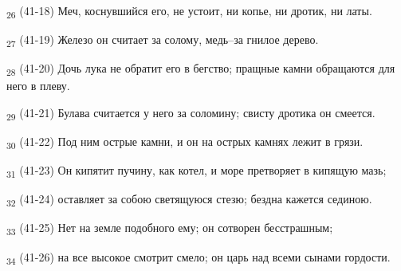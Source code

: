 \begin{tcolorbox}
\textsubscript{26} (41-18) Меч, коснувшийся его, не устоит, ни копье, ни дротик, ни латы.
\end{tcolorbox}
\begin{tcolorbox}
\textsubscript{27} (41-19) Железо он считает за солому, медь--за гнилое дерево.
\end{tcolorbox}
\begin{tcolorbox}
\textsubscript{28} (41-20) Дочь лука не обратит его в бегство; пращные камни обращаются для него в плеву.
\end{tcolorbox}
\begin{tcolorbox}
\textsubscript{29} (41-21) Булава считается у него за соломину; свисту дротика он смеется.
\end{tcolorbox}
\begin{tcolorbox}
\textsubscript{30} (41-22) Под ним острые камни, и он на острых камнях лежит в грязи.
\end{tcolorbox}
\begin{tcolorbox}
\textsubscript{31} (41-23) Он кипятит пучину, как котел, и море претворяет в кипящую мазь;
\end{tcolorbox}
\begin{tcolorbox}
\textsubscript{32} (41-24) оставляет за собою светящуюся стезю; бездна кажется сединою.
\end{tcolorbox}
\begin{tcolorbox}
\textsubscript{33} (41-25) Нет на земле подобного ему; он сотворен бесстрашным;
\end{tcolorbox}
\begin{tcolorbox}
\textsubscript{34} (41-26) на все высокое смотрит смело; он царь над всеми сынами гордости.
\end{tcolorbox}
